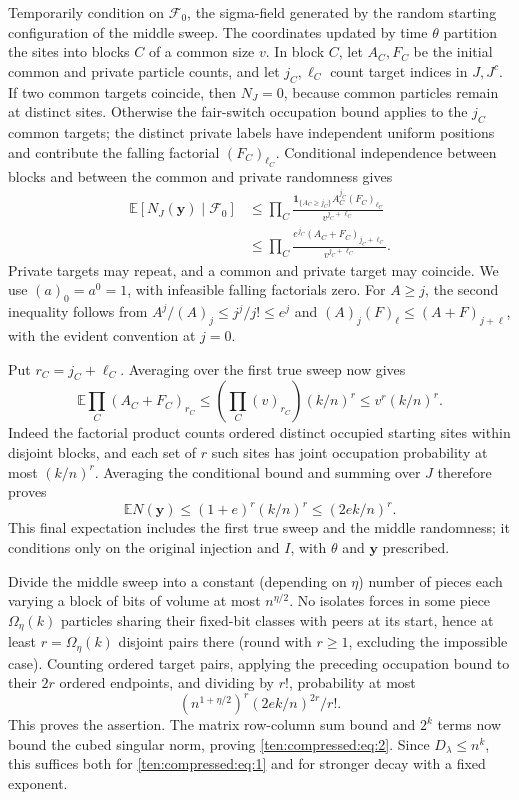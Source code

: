 Temporarily condition on \(\mathcal F_0\), the sigma-field generated by the random starting configuration of the middle sweep. The coordinates updated by time \(\theta\) partition the sites into blocks \(C\) of a common size \(v\). In block \(C\), let \(A_C,F_C\) be the initial common and private particle counts, and let \(j_C,\ell_C\) count target indices in \(J,J^c\). If two common targets coincide, then \(N_J=0\), because common particles remain at distinct sites. Otherwise the fair-switch occupation bound applies to the \(j_C\) common targets; the distinct private labels have independent uniform positions and contribute the falling factorial \((F_C)_{\ell_C}\). Conditional independence between blocks and between the common and private randomness gives
\[
 \begin{split}
 \mathbb E[N_J(\mathbf y)\mid\mathcal F_0]
 &\le \prod_C
      \frac{\mathbf1_{\{A_C\ge j_C\}}A_C^{j_C}(F_C)_{\ell_C}}
           {v^{j_C+\ell_C}}\\
 &\le \prod_C
      \frac{e^{j_C}(A_C+F_C)_{j_C+\ell_C}}
           {v^{j_C+\ell_C}}.
 \end{split}
\]
Private targets may repeat, and a common and private target may coincide. We use \((a)_0=a^0=1\), with infeasible falling factorials zero. For \(A\ge j\), the second inequality follows from
\(A^j/(A)_j\le j^j/j!\le e^j\) and
\((A)_j(F)_\ell\le(A+F)_{j+\ell}\), with the evident convention at \(j=0\).

Put \(r_C=j_C+\ell_C\). Averaging over the first true sweep now gives
\[
 \mathbb E\prod_C(A_C+F_C)_{r_C}
 \le \left(\prod_C(v)_{r_C}\right)(k/n)^r
 \le v^r(k/n)^r.
\]
Indeed the factorial product counts ordered distinct occupied starting sites within disjoint blocks, and each set of \(r\) such sites has joint occupation probability at most \((k/n)^r\). Averaging the conditional bound and summing over \(J\) therefore proves
\[
 \mathbb E N(\mathbf y)
 \le (1+e)^r(k/n)^r
 \le (2e k/n)^r.
\]
This final expectation includes the first true sweep and the middle randomness; it conditions only on the original injection and \(I\), with \(\theta\) and \(\mathbf y\) prescribed.

Divide the middle sweep into a constant (depending on \(\eta\)) number of pieces each varying a block of bits of volume at most \(n^{\eta/2}\). No isolates forces in some piece \(\Omega_\eta(k)\) particles sharing their fixed-bit classes with peers at its start, hence at least \(r=\Omega_\eta(k)\) disjoint pairs there (round with \(r\ge1\), excluding the impossible case). Counting ordered target pairs, applying the preceding occupation bound to their \(2r\) ordered endpoints, and dividing by \(r!\), probability at most
\[
 (n^{1+\eta/2})^r(2ek/n)^{2r}/r!.
\]
This proves the assertion. The matrix row-column sum bound and \(2^k\) terms now bound the cubed singular norm, proving \eqref{ten:compressed:eq:2}. Since \(D_\lambda\le n^k\), this suffices both for \eqref{ten:compressed:eq:1} and for stronger decay with a fixed exponent.

